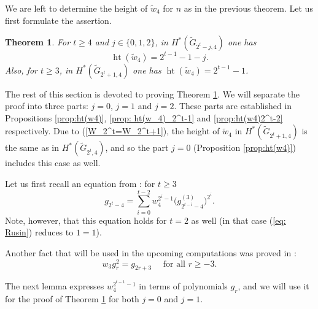\documentclass{amsart}
\newtheorem{theorem}{Theorem}[section]
\theoremstyle{definition}
\theoremstyle{remark}
\numberwithin{equation}{section}
\newcommand{\gr}{\widetilde G}
\newcommand{\w}{\widetilde w}
\newcommand{\htt}{\operatorname{ht}}
\renewcommand{\ge}{\geqslant}
\begin{document}
We are left to determine the height of $\w_4$ for $n$ as in the previous theorem. Let us first formulate the assertion.

\begin{theorem}\label{htw_4}
    For $t\ge4$ and $j\in\{0,1,2\}$, in $H^*(\gr_{2^t-j,4})$ one has
    \[\htt(\w_4) = 2^{t-1}-1-j.\]
    Also, for $t\ge3$, in $H^*(\gr_{2^t+1,4})$ one has $\htt(\w_4) = 2^{t-1}-1$.
    \end{theorem}

The rest of this section is devoted to proving Theorem \ref{htw_4}. We will separate the proof into three parts: $j=0$, $j=1$ and $j=2$. These parts are established in Propositions \ref{prop:ht(w4)}, \ref{prop: ht(w_4)_2^t-1} and \ref{prop:ht(w4)2^t-2} respectively. Due to (\ref{W_2^t=W_2^t+1}), the height of $\w_4$ in $H^*(\gr_{2^t+1,4})$ is the same as in $H^*(\gr_{2^t,4})$, and so the part $j=0$ (Proposition \ref{prop:ht(w4)}) includes this case as well. 

Let us first recall an equation from \cite[Lemma 3.2]{Rusin}: for $t\ge3$
\begin{equation}\label{eq: Rusin}
  g_{2^t-4} = \sum_{i= 0}^{t-2}w_4^{2^i-1}\big(g_{2^{t-i}-4}^{(3)}\big)^{2^i}.
\end{equation}
Note, however, that this equation holds for $t=2$ as well (in that case (\ref{eq: Rusin}) reduces to $1=1$). 

Another fact that will be used in the upcoming computations was proved in \cite[(4.7)]{CJP}:
\begin{equation}\label{w_3kvadrat}
    w_3g_r^2=g_{2r+3} \quad \mbox{ for all } r\ge-3.
\end{equation}

The next lemma expresses $w_4^{2^{t-1}-1}$ in terms of polynomials $g_r$, and we will use it for the proof of Theorem \ref{htw_4} for both $j=0$ and $j=1$.
\end{document}

